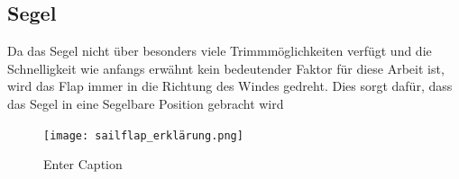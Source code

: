 \subsection{Segel}
Da das Segel nicht über besonders viele Trimmmöglichkeiten verfügt und die Schnelligkeit wie anfangs erwähnt kein bedeutender Faktor für diese Arbeit ist, wird das Flap immer in die Richtung des Windes gedreht. Dies sorgt dafür, dass das Segel in eine Segelbare Position gebracht wird 

\begin{figure}[H]
    \centering
    \texttt{[image: sailflap\_erklärung.png]}
    \caption{Enter Caption}
    \label{fig:enter-label}
\end{figure}









